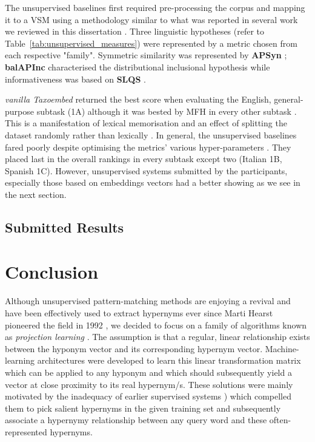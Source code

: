 The unsupervised baselines first required pre-processing the corpus and mapping it to a \ac{VSM} using a methodology similar to what was reported in several work we reviewed in this dissertation \citep{shwartz2017siege, santus2014chasing, roller2014inclusive}.  Three linguistic hypotheses (refer to Table~\ref{tab:unsupervised_measures}) were represented by a metric chosen from each respective "family". Symmetric similarity was represented by \textbf{APSyn} \citep{santus2016unsupervised}; \textbf{balAPInc} \citep{kotlerman2010directional} characterised the distributional inclusional hypothesis while informativeness was based on \textbf{SLQS} \citep{santus2014chasing}.

\textit{vanilla Taxoembed} returned the best score when evaluating the English, general-purpose subtask (1A) although it was bested by MFH in every other subtask \citep{camacho2018semeval}.  This is a manifestation of lexical memorisation and an effect of splitting the dataset randomly rather than lexically \citep{levy2014dependency}.  In general, the unsupervised baselines fared poorly despite optimising the metrics' various hyper-parameters \citep{camacho2018semeval}.  They placed last in the overall rankings in every subtask except two (Italian 1B, Spanish 1C).  However, unsupervised systems submitted by the participants, especially those based on embeddings vectors had a better showing as we see in the next section.

\subsection{Submitted Results}

\section{Conclusion}
Although unsupervised pattern-matching methods are enjoying a revival \citep{roller2018hearst} and have been effectively used to extract hypernyms ever since Marti Hearst pioneered the field in 1992 \citep{hearst1992automatic}, we decided to focus on a family of algorithms known as \textit{projection learning} \citep{ustalov2017negative}.  The assumption is that a regular, linear relationship exists between the hyponym vector and its corresponding hypernym vector.  Machine-learning architectures were developed to learn this linear transformation matrix which can be applied to any hyponym and which should subsequently yield a vector at close proximity to its real hypernym/s.  These solutions were mainly motivated by the inadequacy of earlier supervised systems \citep{baroni2012entailment, weeds2014learning}) which compelled them to pick salient hypernyms in the given training set and subsequently associate a hypernymy relationship between any query word and these often-represented hypernyms.

